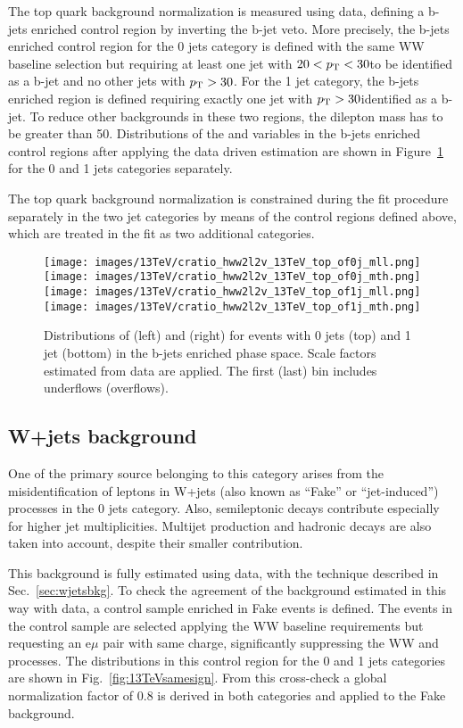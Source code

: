 The top quark background normalization is measured using data, defining a b-jets enriched control region by inverting the b-jet veto. More precisely, the b-jets enriched control region for the 0 jets category is defined with the same WW baseline selection but requiring at least one jet with $20<p_\mathrm{T}<30$\GeV to be identified as a b-jet and no other jets with $p_\mathrm{T} > 30$\GeV. For the 1 jet category, the b-jets enriched region is defined requiring exactly one jet with $p_\mathrm{T}>30$\GeV identified as a b-jet.
To reduce other backgrounds in these two regions, the dilepton mass has to be greater than 50\GeV. Distributions of the \mll and \mt variables in the b-jets enriched control regions after applying the data driven estimation are shown in Figure~\ref{fig:TopCtrl125} for the 0 and 1 jets categories separately.

The top quark background normalization is constrained during the fit procedure separately in the two jet categories by means of the control regions defined above, which are treated in the fit as two additional categories. 

\begin{figure}[htb]
\centering
\texttt{[image: images/13TeV/cratio\_hww2l2v\_13TeV\_top\_of0j\_mll.png]}
\texttt{[image: images/13TeV/cratio\_hww2l2v\_13TeV\_top\_of0j\_mth.png]}
\texttt{[image: images/13TeV/cratio\_hww2l2v\_13TeV\_top\_of1j\_mll.png]}
\texttt{[image: images/13TeV/cratio\_hww2l2v\_13TeV\_top\_of1j\_mth.png]}
\caption{
Distributions of \mll (left) and \mt (right) for events with 0 jets (top) and 1 jet (bottom) in the b-jets enriched phase space. Scale factors estimated from data are applied. The first (last) bin includes underflows (overflows).
}
\label{fig:TopCtrl125}
\end{figure}

\subsection{W+jets background}

One of the primary source belonging to this category arises from the misidentification of leptons in W+jets (also known as ``Fake'' or ``jet-induced'') processes in the 0 jets category. Also, semileptonic \ttbar decays contribute especially for higher jet multiplicities. Multijet production and hadronic \ttbar decays are also taken into account, despite their smaller contribution.

This background is fully estimated using data, with the technique described in Sec.~\ref{sec:wjetsbkg}. To check the agreement of the background estimated in this way with data, a control sample enriched in Fake events is defined. The events in the control sample are selected applying the WW baseline requirements but requesting an e$\mu$ pair with same charge, significantly suppressing the WW and \ttbar processes. The \mll distributions in this control region for the 0 and 1 jets categories are shown in Fig.~\ref{fig:13TeVsamesign}. From this cross-check a global normalization factor of 0.8 is derived in both categories and applied to the Fake background.


